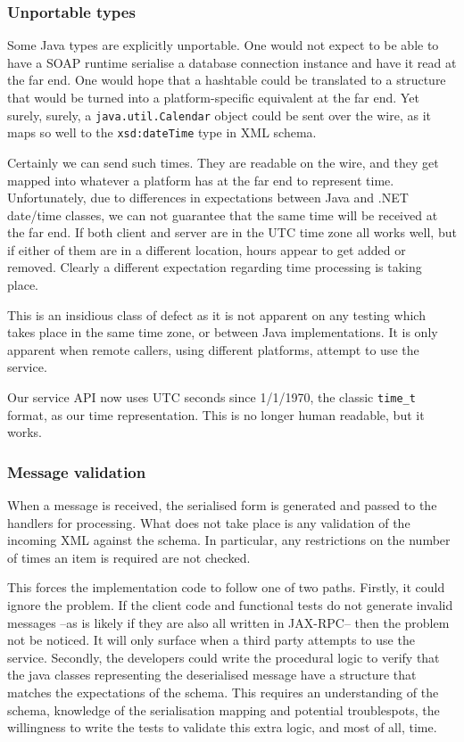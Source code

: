 \subsubsection{Unportable types}
\label{objections:o-x:types}

Some Java types are explicitly unportable. One would not expect to be
able to have a SOAP runtime serialise a database connection instance and
have it read at the far end. One would hope that a hashtable could be
translated to a structure that would be turned into a platform-specific
equivalent at the far end. Yet surely, surely, a {\tt java.util.Calendar}
object could be sent over the wire, as it maps so well to the
{\tt xsd:dateTime} type in XML schema.

Certainly we can send such times. They are readable on the wire, and
they get mapped into whatever a platform has at the far end to represent
time. Unfortunately, due to differences in expectations between Java and
.NET date/time classes, we can not guarantee that the same time will be
received at the far end. If both client and server are in the UTC time
zone all works well, but if either of them are in a different location,
hours appear to get added or removed. Clearly a different expectation
regarding time processing is taking place. 

This is an insidious class of defect as it is not apparent on any
testing which takes place in the same time zone, or between Java
implementations. It is only apparent when remote callers, using
different platforms, attempt to use the service.

Our service API now uses UTC seconds since 1/1/1970, the classic {\tt time\_t}
format, as our time representation. This is no longer human readable,
but it works. 

\subsubsection{Message validation}
\label{objections:o-x:validation}


When a message is received, the serialised form is generated and passed
to the handlers for processing. What does not take place is any
validation of the incoming XML against the schema. In particular, any
restrictions on the number of times an item is required are not checked.

This forces the implementation code to follow one of two paths.
Firstly, it could ignore the problem. If the client code and functional
tests do not generate invalid messages --as is likely if they are also
all written in JAX-RPC-- then the problem not be noticed. It will only
surface when a third party attempts to use the service.
Secondly, the developers could write the procedural logic to verify that
the java classes representing the deserialised message have a structure
that matches the expectations of the schema. This requires an
understanding of the schema, knowledge of the serialisation mapping and
potential troublespots,  the willingness to write the tests to validate
this extra logic, and most of all, time. 

